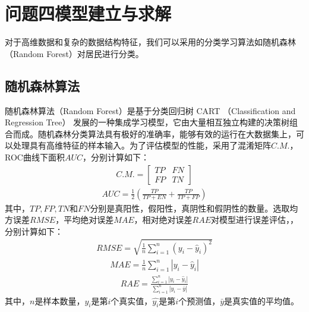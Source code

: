 \documentclass{cumcmthesis}
\begin{document}
\section{问题四模型建立与求解}
对于高维数据和复杂的数据结构特征，我们可以采用的分类学习算法如随机森林（Random Forest）对居民进行分类。
\subsection{随机森林算法}
随机森林算法（Random Forest）是基于分类回归树 CART （Classification and Regression Tree） 发展的一种集成学习模型，它由大量相互独立构建的决策树组合而成。随机森林分类算法具有极好的准确率，能够有效的运行在大数据集上，可以处理具有高维特征的样本输入。为了评估模型的性能，采用了混淆矩阵$C.M.$，ROC曲线下面积$AUC$，分别计算如下：
\begin{eqnarray}
C.M.=\begin{bmatrix}
  TP&FN \\
  FP&TN
\end{bmatrix}
\end{eqnarray}
\begin{eqnarray}
AUC=\frac{1}{2}(\frac{TP}{TP+EN}+\frac{TP}{TP+FP})
\end{eqnarray}
其中，$TP,FP,TN$和$FN$分别是真阳性，假阳性，真阴性和假阴性的数量。选取均方误差$RMSE$，平均绝对误差$MAE$，相对绝对误差$RAE$对模型进行误差评估，，分别计算如下：
\begin{eqnarray}
RMSE = \sqrt{\frac{1}{n} \sum_{i=1}^{n} (y_i - \hat{y}_i)^2}
\end{eqnarray}
\begin{eqnarray}
MAE = \frac{1}{n} \sum_{i=1}^{n} |y_i - \hat{y}_i|
\end{eqnarray}
\begin{eqnarray}
RAE = \frac{\sum_{i=1}^{n} |y_i - \hat{y}_i|}{\sum_{i=1}^{n} |y_i - \bar{y}|}
\end{eqnarray}
其中，$n$是样本数量，$y_i$是第$i$个真实值，$\hat{y_i}$是第$i$个预测值，$\bar{y}$是真实值的平均值。
\end{document}
